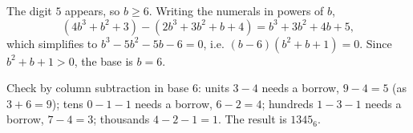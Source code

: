 The digit $5$ appears, so $b\ge6$. Writing the numerals in powers of $b$,
\[
(4b^3+b^2+3)-(2b^3+3b^2+b+4)=b^3+3b^2+4b+5 ,
\]
which simplifies to $b^3-5b^2-5b-6=0$, i.e. $(b-6)(b^2+b+1)=0$. Since $b^2+b+1>0$, the base is $b=\boxed{6}$.

Check by column subtraction in base $6$: units $3-4$ needs a borrow, $9-4=5$ (as $3+6=9$); tens $0-1-1$ needs a borrow, $6-2=4$; hundreds $1-3-1$ needs a borrow, $7-4=3$; thousands $4-2-1=1$. The result is $1345_6$.
